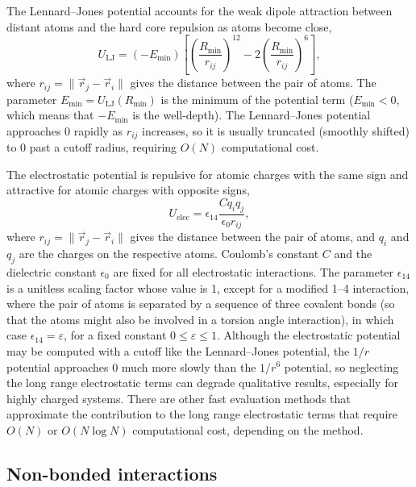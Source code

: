 The Lennard--Jones potential
accounts for the weak dipole attraction between distant atoms and
the hard core repulsion as atoms become close,
\begin{equation}
U_{\text{LJ}} = (-E_{\text{min}}) \left[ 
    \left( \frac{R_{\text{min}}}{r_{ij}} \right)^{12} -
    2 \left( \frac{R_{\text{min}}}{r_{ij}} \right)^{6} \right],
\end{equation}
where $r_{ij} = \|\vec{r}_j - \vec{r}_i\|$ gives the distance
between the pair of atoms.
The parameter $E_{\text{min}} = U_{\text{LJ}}(R_{\text{min}})$ is 
the minimum of the potential term
($E_{\text{min}} < 0$, which means that $-E_{\text{min}}$ is the well-depth).
The Lennard--Jones potential approaches 0 rapidly as $r_{ij}$
increases, so it is usually truncated (smoothly shifted) to 0
past a cutoff radius, requiring $O(N)$ computational cost.

The electrostatic potential
is repulsive for atomic charges with the same sign
and attractive for atomic charges with opposite signs,
\begin{equation}
U_{\text{elec}} = \epsilon_{14} \frac{C q_i q_j}{\epsilon_0 r_{ij}},
\end{equation}
where $r_{ij} = \|\vec{r}_j - \vec{r}_i\|$ gives the distance
between the pair of atoms,
and $q_i$ and $q_j$ are the charges on the respective atoms.
Coulomb's constant $C$ and the dielectric constant $\epsilon_0$
are fixed for all electrostatic interactions.
The parameter $\epsilon_{14}$ is a unitless scaling factor 
whose value is 1,
except for a modified 1--4 interaction,
where the pair of atoms is separated by a sequence
of three covalent bonds (so that the atoms might
also be involved in a torsion angle interaction),
in which case $\epsilon_{14} = \varepsilon$,
for a fixed constant $0 \leq \varepsilon \leq 1$.
Although the electrostatic potential may be computed with
a cutoff like the Lennard--Jones potential,
the $1/r$ potential approaches 0 much more
slowly than the $1/r^6$ potential,
so neglecting the long range electrostatic terms
can degrade qualitative results,
especially for highly charged systems.
There are other fast evaluation methods that approximate
the contribution to the long range electrostatic terms
that require $O(N)$ or $O(N \log N)$ computational cost,
depending on the method.


\subsection{Non-bonded interactions}
\label{section:electdesc}

